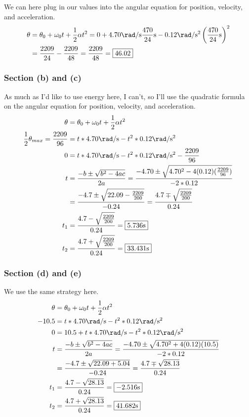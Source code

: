 \documentclass[12pt]{article}
\begin{document}
We can here plug in our values into the angular equation for position, velocity, and acceleration.
\begin{align*}
    \theta  &=  \theta_0 + \omega_0 t + \frac{1}{2}\alpha t^2
        =   0 + 4.70 \unit{\rad/\second} \frac{470}{24}\unit{\second} - 0.12 \unit{\rad/\second^2} \left(\frac{470}{24}\unit{\second}\right)^2\\
        &=  \frac{2209}{24} - \frac{2209}{48}
        =   \frac{2209}{48}
        =   \boxed{46.02}
\end{align*}

\subsubsection*{Section (b) and (c)}
As much as I'd like to use energy here, I can't, so I'll use the quadratic formula on the angular equation for position, velocity, and acceleration.
\begin{align*}
    \theta  &=  \theta_0 + \omega_0 t + \frac{1}{2}\alpha t^2\\
    \frac{1}{2}\theta_{max} = \frac{2209}{96}   &=  t*4.70 \unit{\rad/\second} - t^2*0.12 \unit{\rad/\second^2}\\
    0   &=  t*4.70 \unit{\rad/\second} - t^2*0.12 \unit{\rad/\second^2} - \frac{2209}{96}\\
    t   &=  \frac{-b \pm \sqrt{b^2 - 4ac}}{2a}
        =   \frac{-4.70 \pm \sqrt{4.70^2 - 4(0.12)(\frac{2209}{96})}}{-2*0.12}\\
        &=  \frac{-4.7 \pm \sqrt{22.09 - \frac{2209}{200}}}{-0.24}
        =   \frac{4.7 \mp \sqrt{\frac{2209}{200}}}{0.24}\\
    t_1 &=  \frac{4.7 - \sqrt{\frac{2209}{200}}}{0.24}
        =   \boxed{5.736\unit{\second}}\\
    t_2 &=  \frac{4.7 + \sqrt{\frac{2209}{200}}}{0.24}
    =   \boxed{33.431\unit{\second}}
\end{align*}

\subsubsection*{Section (d) and (e)}
We use the same strategy here.
\begin{align*}
    \theta  &=  \theta_0 + \omega_0 t + \frac{1}{2}\alpha t^2\\
    -10.5   &=  t*4.70 \unit{\rad/\second} - t^2*0.12 \unit{\rad/\second^2}\\
    0   &=  10.5 + t*4.70 \unit{\rad/\second} - t^2*0.12 \unit{\rad/\second^2}\\
    t   &=  \frac{-b \pm \sqrt{b^2 - 4ac}}{2a}
        =   \frac{-4.70 \pm \sqrt{4.70^2 + 4(0.12)(10.5)}}{-2*0.12}\\
        &=  \frac{-4.7 \pm \sqrt{22.09 + 5.04}}{-0.24}
        =   \frac{4.7 \mp \sqrt{28.13}}{0.24}\\
    t_1 &=  \frac{4.7 - \sqrt{28.13}}{0.24}
        =   \boxed{-2.516\unit{\second}}\\
    t_2 &=  \frac{4.7 + \sqrt{28.13}}{0.24}
    =   \boxed{41.682\unit{\second}}
\end{align*}
\end{document}

